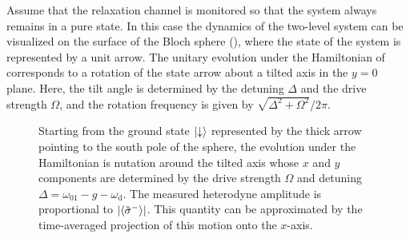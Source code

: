 Assume that the relaxation channel is monitored so that the system always remains in a pure state. In this case the dynamics of the two-level system can be visualized on the surface of the Bloch sphere (), where the state of the system is represented by a unit arrow. The unitary evolution under the Hamiltonian of  corresponds to a rotation of the state arrow about a tilted axis in the $y=0$ plane. Here, the tilt angle is determined by the detuning $\Delta$ and the drive strength $\Omega$, and the rotation frequency is given by $\sqrt{\Delta^2+\Omega^2}/2\pi$.%
\begin{figure}
 \centering
 \caption[Bloch sphere picture for the qubit--photon 2-level system]
 { Starting from the
 ground state $\lvert\downarrow\rangle$ represented by the thick arrow pointing to the south pole of the sphere, the evolution under the Hamiltonian is nutation around the tilted axis whose $x$ and $y$ components are
 determined by the drive strength $\Omega$ and detuning $\Delta=\omega_{01} - g-\omega_\text{d}$. The measured heterodyne amplitude is proportional  to $\lvert\langle\tilde{\sigma}^-\rangle\rvert$. This quantity can be approximated by the time-averaged projection of this motion onto the $x$-axis.\label{fig:arrows}}
 \end{figure}


